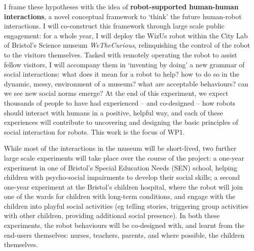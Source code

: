 \documentclass[11pt,a4paper]{report}
\newcommand{\project}{WizUs\xspace}
\begin{document}



I frame these hypotheses with the idea of \textbf{robot-supported human-human
interactions}, a novel conceptual framework to `think' the future human-robot
interactions. I will co-construct this framework through large scale public
engagement: for a whole year, I will deploy the \project robot within the City
Lab of Bristol's Science museum \emph{WeTheCurious}, relinquishing the control
of the robot to the visitors themselves. Tasked with remotely operating the
robot to assist fellow visitors, I will accompany them in `inventing by doing' a
new grammar of social interactions: what does it mean for a robot to help? how
to do so in the dynamic, messy, environment of a museum? what are acceptable
behaviours? can we see new social norms emerge? At the end of this experiment,
we expect thousands of people to have had experienced -- and co-designed -- how
robots should interact with humans in a positive, helpful way, and each of these
experiences will contribute to uncovering and designing the basic principles of
social interaction for robots. This work is the focus of WP1.

While most of the interactions in the museum will be short-lived, two further
large scale experiments will take place over the course of the project: a
one-year experiment in one of Bristol's Special Education Needs (SEN) school,
helping children with psycho-social impairments to develop their social skills;
a second one-year  experiment at the Bristol's children hospital, where the
robot will join one of the wards for children with long-term conditions, and
engage with the children into playful social activities (eg telling stories,
triggering group activities with other children, providing additional social
presence). In both these experiments, the robot behaviours will be co-designed
with, and learnt from the end-users themselves: nurses, teachers, parents, and
where possible, the children themselves.
\end{document}
